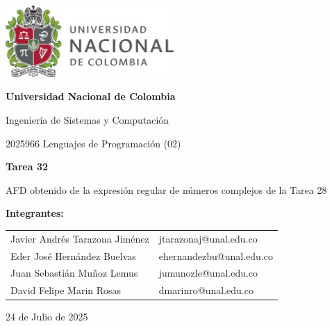 \documentclass{article}
\begin{document}
\begin{titlepage}
    \centering
    \includegraphics[width=0.48\textwidth]{logo_universidad.png}
    \par\vspace{2cm}

    {\Large \textbf{Universidad Nacional de Colombia} \par}
    \vspace{0.5cm}
    {\large Ingeniería de Sistemas y Computación \par}
    {\large 2025966 Lenguajes de Programación (02)\par}
    \vspace{3cm}

    {\large \textbf{Tarea 32} \par}
    {\large AFD obtenido de la expresión regular de números complejos de la Tarea 28\par}
    \vspace{3cm}

    {\large \textbf{Integrantes:} \par}
    \vspace{0.5cm}
    \begin{tabular}{ll}
    Javier Andrés Tarazona Jiménez & jtarazonaj@unal.edu.co   \\
    Eder  José Hernández Buelvas   & ehernandezbu@unal.edu.co \\
    Juan Sebastián Muñoz Lemus     & jumunozle@unal.edu.co   \\
    David Felipe Marin Rosas       & dmarinro@unal.edu.co   \\
    \end{tabular}
    \par\vspace{3cm}

    {\large 24 de Julio de 2025 \par}
\end{titlepage}

\tableofcontents %

\newpage %
\end{document}
